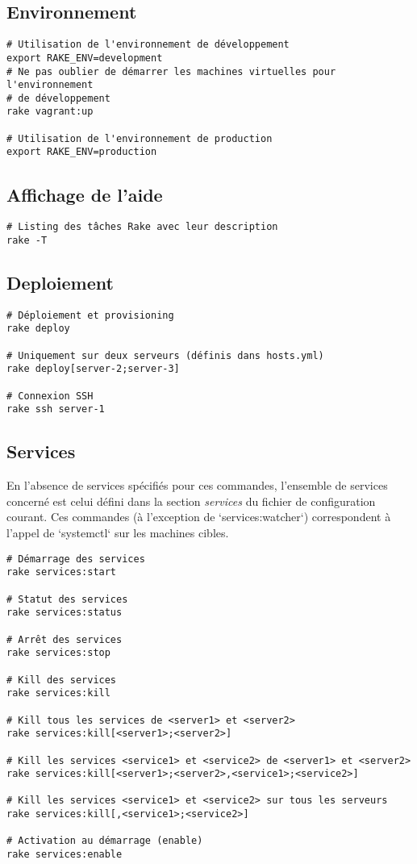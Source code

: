 \documentclass[a4paper,oneside,11pt]{article}
\begin{document}
\subsection{Environnement}

\begin{verbatim}
# Utilisation de l'environnement de développement
export RAKE_ENV=development
# Ne pas oublier de démarrer les machines virtuelles pour l'environnement 
# de développement
rake vagrant:up

# Utilisation de l'environnement de production
export RAKE_ENV=production
\end{verbatim}

\subsection{Affichage de l'aide}

\begin{verbatim}
# Listing des tâches Rake avec leur description
rake -T
\end{verbatim}

\subsection{Deploiement}

\begin{verbatim}
# Déploiement et provisioning
rake deploy

# Uniquement sur deux serveurs (définis dans hosts.yml)
rake deploy[server-2;server-3]

# Connexion SSH
rake ssh server-1
\end{verbatim}

\subsection{Services}

En l'absence de services spécifiés pour ces commandes, l'ensemble de services
concerné est celui défini dans la section \textit{services} du fichier de configuration
courant. Ces commandes (à l'exception de `services:watcher`) correspondent
à l'appel de `systemctl` sur les machines cibles.

\begin{verbatim}
# Démarrage des services
rake services:start

# Statut des services
rake services:status

# Arrêt des services
rake services:stop

# Kill des services
rake services:kill

# Kill tous les services de <server1> et <server2>
rake services:kill[<server1>;<server2>]

# Kill les services <service1> et <service2> de <server1> et <server2>
rake services:kill[<server1>;<server2>,<service1>;<service2>]

# Kill les services <service1> et <service2> sur tous les serveurs
rake services:kill[,<service1>;<service2>]

# Activation au démarrage (enable)
rake services:enable
\end{verbatim}
\end{document}
